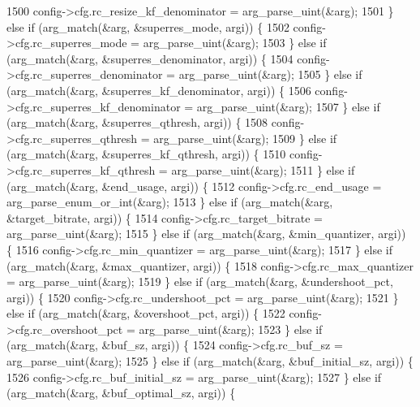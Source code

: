 \begin{DoxyCodeInclude}
{{{{{{{{{{{{{{{{{1500       config->cfg.rc\_resize\_kf\_denominator = arg\_parse\_uint(&arg);
1501     \} \textcolor{keywordflow}{else} \textcolor{keywordflow}{if} (arg\_match(&arg, &superres\_mode, argi)) \{
1502       config->cfg.rc\_superres\_mode = arg\_parse\_uint(&arg);
1503     \} \textcolor{keywordflow}{else} \textcolor{keywordflow}{if} (arg\_match(&arg, &superres\_denominator, argi)) \{
1504       config->cfg.rc\_superres\_denominator = arg\_parse\_uint(&arg);
1505     \} \textcolor{keywordflow}{else} \textcolor{keywordflow}{if} (arg\_match(&arg, &superres\_kf\_denominator, argi)) \{
1506       config->cfg.rc\_superres\_kf\_denominator = arg\_parse\_uint(&arg);
1507     \} \textcolor{keywordflow}{else} \textcolor{keywordflow}{if} (arg\_match(&arg, &superres\_qthresh, argi)) \{
1508       config->cfg.rc\_superres\_qthresh = arg\_parse\_uint(&arg);
1509     \} \textcolor{keywordflow}{else} \textcolor{keywordflow}{if} (arg\_match(&arg, &superres\_kf\_qthresh, argi)) \{
1510       config->cfg.rc\_superres\_kf\_qthresh = arg\_parse\_uint(&arg);
1511     \} \textcolor{keywordflow}{else} \textcolor{keywordflow}{if} (arg\_match(&arg, &end\_usage, argi)) \{
1512       config->cfg.rc\_end\_usage = arg\_parse\_enum\_or\_int(&arg);
1513     \} \textcolor{keywordflow}{else} \textcolor{keywordflow}{if} (arg\_match(&arg, &target\_bitrate, argi)) \{
1514       config->cfg.rc\_target\_bitrate = arg\_parse\_uint(&arg);
1515     \} \textcolor{keywordflow}{else} \textcolor{keywordflow}{if} (arg\_match(&arg, &min\_quantizer, argi)) \{
1516       config->cfg.rc\_min\_quantizer = arg\_parse\_uint(&arg);
1517     \} \textcolor{keywordflow}{else} \textcolor{keywordflow}{if} (arg\_match(&arg, &max\_quantizer, argi)) \{
1518       config->cfg.rc\_max\_quantizer = arg\_parse\_uint(&arg);
1519     \} \textcolor{keywordflow}{else} \textcolor{keywordflow}{if} (arg\_match(&arg, &undershoot\_pct, argi)) \{
1520       config->cfg.rc\_undershoot\_pct = arg\_parse\_uint(&arg);
1521     \} \textcolor{keywordflow}{else} \textcolor{keywordflow}{if} (arg\_match(&arg, &overshoot\_pct, argi)) \{
1522       config->cfg.rc\_overshoot\_pct = arg\_parse\_uint(&arg);
1523     \} \textcolor{keywordflow}{else} \textcolor{keywordflow}{if} (arg\_match(&arg, &buf\_sz, argi)) \{
1524       config->cfg.rc\_buf\_sz = arg\_parse\_uint(&arg);
1525     \} \textcolor{keywordflow}{else} \textcolor{keywordflow}{if} (arg\_match(&arg, &buf\_initial\_sz, argi)) \{
1526       config->cfg.rc\_buf\_initial\_sz = arg\_parse\_uint(&arg);
1527     \} \textcolor{keywordflow}{else} \textcolor{keywordflow}{if} (arg\_match(&arg, &buf\_optimal\_sz, argi)) \{
}}}}}}}}}}}}}}}}}
\end{DoxyCodeInclude}
